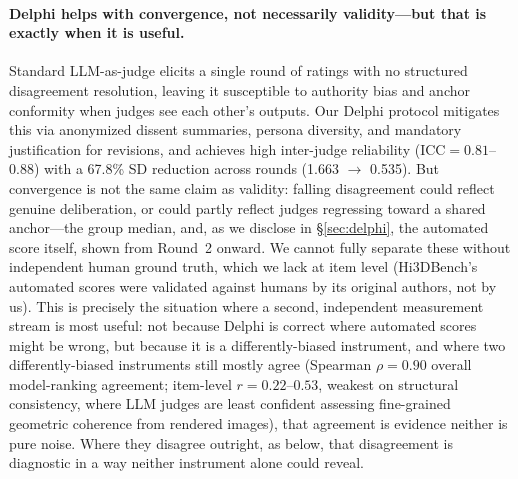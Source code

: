 \documentclass[10pt]{article}
\begin{document}
\paragraph{Delphi helps with convergence, not necessarily validity---but
that is exactly when it is useful.}
Standard LLM-as-judge elicits a single round of ratings with no structured
disagreement resolution, leaving it susceptible to authority bias and
anchor conformity when judges see each other's outputs. Our Delphi
protocol mitigates this via anonymized dissent summaries, persona
diversity, and mandatory justification for revisions, and achieves high
inter-judge reliability (ICC$=0.81$--$0.88$) with a 67.8\% SD reduction
across rounds (1.663 $\to$ 0.535). But convergence is not the same claim as
validity: falling disagreement could reflect genuine deliberation, or
could partly reflect judges regressing toward a shared anchor---the group
median, and, as we disclose in \S\ref{sec:delphi}, the automated score
itself, shown from Round~2 onward. We cannot fully separate these without
independent human ground truth, which we lack at item level (Hi3DBench's
automated scores were validated against humans by its original authors,
not by us). This is precisely the situation where a second, independent
measurement stream is most useful: not because Delphi is correct where
automated scores might be wrong, but because it is a differently-biased
instrument, and where two differently-biased instruments still mostly
agree (Spearman $\rho=0.90$ overall model-ranking agreement; item-level
$r=0.22$--$0.53$, weakest on structural consistency, where LLM judges are
least confident assessing fine-grained geometric coherence from rendered
images), that agreement is evidence neither is pure noise. Where they
disagree outright, as below, that disagreement is diagnostic in a way
neither instrument alone could reveal.
\end{document}

